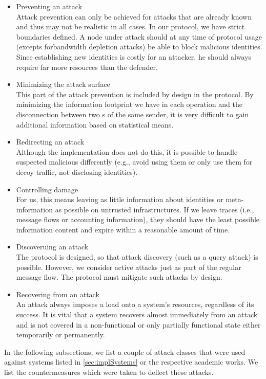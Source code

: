 \begin{itemize}
	\item Preventing an attack\\
	Attack prevention can only be achieved for attacks that are already known and thus may not be realistic in all cases. In our protocol, we have strict boundaries defined. A node under attack should at any time of protocol usage (excepts forbandwidth depletion attacks) be able to block malicious identities. Since establishing new identities is costly for an attacker, he should always require far more resources than the defender.
	\item Minimizing the attack surface\\
	This part of the attack prevention is included by design in the protocol. By minimizing the information footprint we have in each operation and the disconnection between two s of the same sender, it is very difficult to gain additional information based on statistical means.
	\item Redirecting an attack\\
	Although the implementation does not do this, it is possible to handle suspected malicious \VortexNode{} differently (e.g., avoid using them or only use them for decoy traffic, not disclosing identities).
	\item Controlling damage\\
	For us, this means leaving as little information about identities or meta-information as possible on untrusted infrastructures. If we leave traces (i.e., message flows or accounting information), they should have the least possible information content and expire within a reasonable amount of time.
	\item Discoveruing an attack\\
	The protocol is designed, so that attack discovery (such as a query attack) is possible. However, we consider active attacks just as part of the regular message flow. The protocol must mitigate such attacks by design.
	\item Recovering from an attack\\
	An attack always imposes a load onto a system's resources, regardless of its success. It is vital that a system recovers almost immediately from an attack and is not covered in a non-functional or only partially functional state either temporarily or permanently.
\end{itemize}

In the following subsections, we list a couple of attack classes that were used against systems listed in \cref{sec:implSystems} or the respective academic works. We list the countermeasures which were taken to deflect these attacks.

